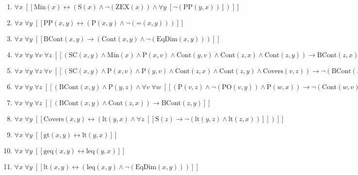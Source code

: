 \documentclass{article}
\begin{document}
\begin{enumerate}
\item $\forall x\;  \left[ \left[ \textrm{Min}(x) \leftrightarrow \left(\textrm{S}(x) \land \neg \left(\textrm{ZEX}(x)\right) \land \forall y\;  \left[ \neg \left(\textrm{PP}(y,x)\right) \right]\right) \right] \right]$
\item $\forall x\; \forall y\;  \left[ \left[ \textrm{PP}(x,y) \leftrightarrow \left(\textrm{P}(x,y) \land \neg \left(\textrm{=}(x,y)\right)\right) \right] \right]$
\item $\forall x\; \forall y\;  \left[ \left[ \textrm{BCont}(x,y) \rightarrow \left(\textrm{Cont}(x,y) \land \neg \left(\textrm{EqDim}(x,y)\right)\right) \right] \right]$
\item $\forall x\; \forall y\; \forall v\; \forall z\;  \left[ \left[ \left(\textrm{SC}(x,y) \land \textrm{Min}(x) \land \textrm{P}(x,v) \land \textrm{Cont}(y,v) \land \textrm{Cont}(z,x) \land \textrm{Cont}(z,y)\right) \rightarrow \textrm{BCont}(z,x) \right] \right]$
\item $\forall x\; \forall y\; \forall z\; \forall v\;  \left[ \left[ \left(\textrm{SC}(x,y) \land \textrm{P}(x,v) \land \textrm{P}(y,v) \land \textrm{Cont}(z,x) \land \textrm{Cont}(z,y) \land \textrm{Covers}(v,z)\right) \rightarrow \neg \left(\textrm{BCont}(z,v)\right) \right] \right]$
\item $\forall x\; \forall y\; \forall z\;  \left[ \left[ \left(\textrm{BCont}(x,y) \land \textrm{P}(y,z) \land \forall v\; \forall w\;  \left[ \left[ \left(\textrm{P}(v,z) \land \neg \left(\textrm{PO}(v,y)\right) \land \textrm{P}(w,x)\right) \rightarrow \neg \left(\textrm{Cont}(w,v)\right) \right] \right]\right) \rightarrow \textrm{BCont}(x,z) \right] \right]$
\item $\forall x\; \forall y\; \forall z\;  \left[ \left[ \left(\textrm{BCont}(x,y) \land \textrm{Cont}(z,x)\right) \rightarrow \textrm{BCont}(z,y) \right] \right]$
\item $\forall x\; \forall y\;  \left[ \left[ \textrm{Covers}(x,y) \leftrightarrow \left(\textrm{lt}(y,x) \land \forall z\;  \left[ \left[ \textrm{S}(z) \rightarrow \neg \left(\textrm{lt}(y,z) \land \textrm{lt}(z,x)\right) \right] \right]\right) \right] \right]$
\item $\forall x\; \forall y\;  \left[ \left[ \textrm{gt}(x,y) \leftrightarrow \textrm{lt}(y,x) \right] \right]$
\item $\forall x\; \forall y\;  \left[ \left[ \textrm{geq}(x,y) \leftrightarrow \textrm{leq}(y,x) \right] \right]$
\item $\forall x\; \forall y\;  \left[ \left[ \textrm{lt}(x,y) \leftrightarrow \left(\textrm{leq}(x,y) \land \neg \left(\textrm{EqDim}(x,y)\right)\right) \right] \right]$

\end{enumerate}
\end{document}
